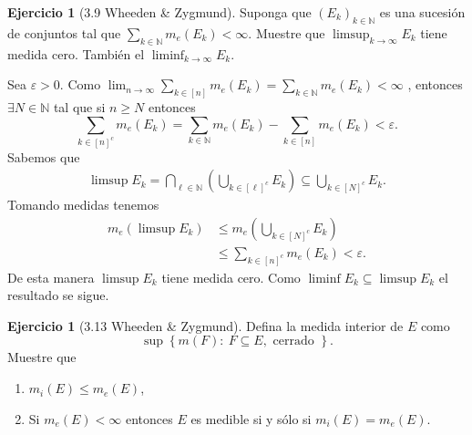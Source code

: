 \documentclass[12pt]{article}
\theoremstyle{plain}
\theoremstyle{definition}
\newtheorem{Ej}[Th]{Ejercicio}
\theoremstyle{remark}
\numberwithin{equation}{section}
\newcommand{\bN}{\mathbb{N}}        %
\renewcommand{\geq}{\geqslant}      %
\renewcommand{\leq}{\leqslant}      %
\renewcommand{\:}{\colon}           %
\newcommand{\conj}[1]{\left\lbrace#1\right\rbrace}
\newcommand{\bonj}[1]{\left\lbrack#1\right\rbrack}
\begin{document}
\begin{multicols}{2}
\begin{Ej}[3.9  Wheeden \& Zygmund]
 Suponga que $(E_k)_{k\in\bN}$ es una sucesión de conjuntos tal que $\sum_{k\in\bN}m_e(E_k)<\infty$. Muestre que $\limsup_{k\to\infty}E_k$ tiene medida cero. También el $\liminf_{k\to\infty} E_k$.
\end{Ej}

\begin{ptcbp}

Sea $\varepsilon>0$. Como $\lim_{n\to\infty}\sum_{k\in\bonj{n}}m_e(E_k)=\sum_{k\in\bN}m_e(E_k)<\infty$ , entonces $\exists N\in\bN$ tal que si $n\geq N$ entonces
$$\sum_{k\in\bonj{n}^c}m_e(E_k)=\sum_{k\in\bN}m_e(E_k)-\sum_{k\in\bonj{n}}m_e(E_k)<\varepsilon.$$
Sabemos que
\begin{gather*}
  \limsup E_k=\bigcap_{\ell\in\bN}\left(\bigcup_{k\in\bonj{\ell}^c}E_k\right)\subseteq\bigcup_{k\in\bonj{N}^c}E_k.
\end{gather*}
Tomando medidas tenemos
\begin{align*}
  m_e(\limsup E_k) & \leq m_e\left(\bigcup_{k\in\bonj{N}^c}E_k\right)\\
  &\leq\sum_{k\in\bonj{n}^c}m_e(E_k)<\varepsilon.
\end{align*}
De esta manera $\limsup E_k$ tiene medida cero. Como $\liminf E_k\subseteq\limsup E_k$ el resultado se sigue.
\iffalse
existe $N\in\bN$ tal que $\sum_{k\in\bonj{N-1}^c}m_e(E_k)<\varepsilon$. De esta manera
$$\limsup_{k\to\infty} E_k=\bigcap_{j\in\bN}\left(\bigcup_{k\in\bonj{j-1}^c}E_k\right)\subseteq\bigcup_{k\in\bonj{m-1}^c}E_k.$$
Luego tenemos que
\begin{align*}
  m_e(\limsup_{k\to\infty} E_k) &<m_e\left(\bigcup_{k\in\bN}E_k\right)\\
                            &\leq\sum_{k\in\bN}m_e(E_k)\\
                            &<\varepsilon.
\end{align*}
Por tanto  $\limsup_{k\to\infty} E_k$ tiene medida cero. Como el $\limsup$ le gana al $\liminf$ tenemos el resultado.
\fi
\end{ptcbp}

\begin{Ej}[3.13  Wheeden \& Zygmund]
 Defina la medida interior de $E$ como
 $$\sup\conj{m(F)\:\ F\subseteq E, \text{ cerrado }}.$$
 Muestre que
 \begin{enumerate}
   \item $m_i(E)\leq m_e(E)$,
   \item Si $m_e(E)<\infty$ entonces $E$ es medible si y sólo si $m_i(E)=m_e(E)$.
 \end{enumerate}
\end{Ej}


\end{multicols}
\end{document}
